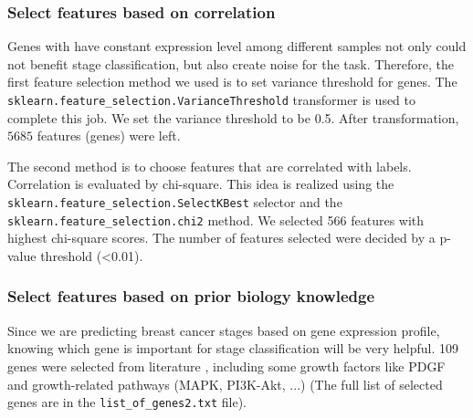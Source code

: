 \documentclass{article}
\begin{document}
\subsubsection{Select features based on correlation}
Genes with have constant expression level among different samples not only could not benefit stage classification, but also create noise for the task. Therefore, the first feature selection method we used is to set variance threshold for genes. The \texttt{sklearn.feature\_selection.VarianceThreshold} transformer is used to complete this job. We set the variance threshold to be 0.5. After transformation, $5685$ features (genes) were left. 

The second method is to choose features that are correlated with labels. Correlation is evaluated by chi-square. This idea is realized using the \texttt{sklearn.feature\_selection.SelectKBest} selector and the \texttt{sklearn.feature\_selection.chi2} method. We selected 566 features with highest chi-square scores. The number of features selected were decided by a p-value threshold (<0.01).

\subsubsection{Select features based on prior biology knowledge}
Since we are predicting breast cancer stages based on gene expression profile, knowing which gene is important for stage classification will be very helpful. 109 genes were selected from literature \cite{breastcancer}, including some growth factors like PDGF and growth-related pathways (MAPK, PI3K-Akt, ...) (The full list of selected genes are in the \texttt{list\_of\_genes2.txt} file). 
\end{document}
